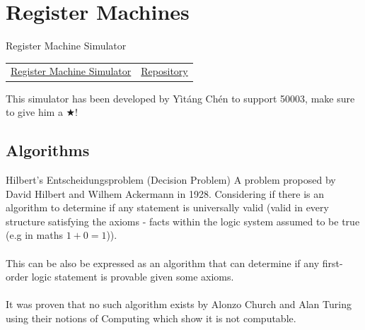 \chapter{Register Machines}

\begin{sidenotebox}{Register Machine Simulator}
	\begin{center}
		\begin{tabular}{c c}
			\href{ https://mmzk1526.github.io/rm_front_end/}{Register Machine Simulator} & \href{https://github.com/MMZK1526/Haskell-RM}{Repository} \\
		\end{tabular}
	\end{center}
	This simulator has been developed by Yìtáng Chén to support 50003, make sure to give him a $\bigstar$!
\end{sidenotebox}
\section{Algorithms}

\begin{definitionbox}{Hilbert's Entscheidungsproblem (Decision Problem)}
	A problem proposed by David Hilbert and Wilhem Ackermann in 1928. Considering if there is an algorithm to determine if any statement is universally valid (valid in every structure satisfying the axioms - facts within the logic system assumed to be true (e.g in maths $1 + 0 = 1$)).
	\\
	\\ This can be also be expressed as an algorithm that can determine if any first-order logic statement is provable given some axioms.
	\\
	\\ It was proven that no such algorithm exists by Alonzo Church and Alan Turing using their notions of Computing which show it is not computable.
\end{definitionbox}

